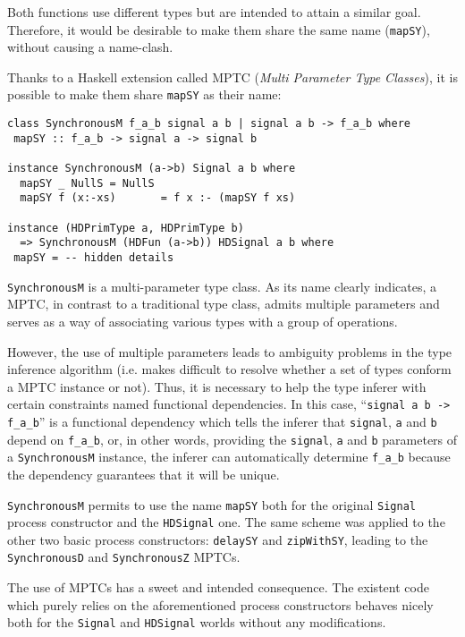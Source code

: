 Both functions use different types but are intended to attain a
similar goal. Therefore, it would be desirable to make them share the same
name (\texttt{mapSY}), without causing a name-clash.

Thanks to a Haskell extension called MPTC \cite{fundep} (\textit{Multi
  Parameter Type Classes}), it is possible to make them share
\texttt{mapSY} as their name:

\begin{lstlisting}
class SynchronousM f_a_b signal a b | signal a b -> f_a_b where
 mapSY :: f_a_b -> signal a -> signal b

instance SynchronousM (a->b) Signal a b where
  mapSY _ NullS = NullS
  mapSY f (x:-xs)       = f x :- (mapSY f xs)

instance (HDPrimType a, HDPrimType b)
  => SynchronousM (HDFun (a->b)) HDSignal a b where
 mapSY = -- hidden details
\end{lstlisting}

\texttt{SynchronousM} is a multi-parameter type class. As its name
clearly indicates, a MPTC, in contrast to a traditional type class,
admits multiple parameters and serves as a way of associating various
types with a group of operations.

However, the use of multiple parameters leads to ambiguity problems in
the type inference algorithm (i.e. makes difficult to resolve whether
a set of types conform a MPTC instance or not). Thus, it is necessary
to help the type inferer with certain constraints named functional
dependencies.  In this case, ``\texttt{signal a b -> f\_a\_b}'' is a
functional dependency which tells the inferer that \texttt{signal},
\texttt{a} and \texttt{b} depend on \texttt{f\_a\_b}, or, in other
words, providing the \texttt{signal}, \texttt{a} and \texttt{b}
parameters of a \texttt{SynchronousM} instance, the inferer can
automatically determine \texttt{f\_a\_b} because the dependency 
guarantees that it will be unique.

\texttt{SynchronousM} permits to use the name \texttt{mapSY} both for
the original \texttt{Signal} process constructor and the
\texttt{HDSignal} one.  The same scheme was applied to the other two
basic process constructors: \texttt{delaySY} and \texttt{zipWithSY},
leading to the \texttt{SynchronousD} and \texttt{SynchronousZ} MPTCs.

The use of MPTCs has a sweet and intended consequence. The existent
code which purely relies on the aforementioned process constructors
behaves nicely both for the \texttt{Signal} and \texttt{HDSignal}
worlds without any modifications.

